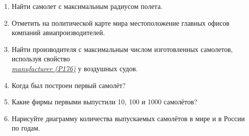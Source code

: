 \begin{enumerate}
\item Найти самолет с максимальным радиусом полета.
\item Отметить на политической карте мира местоположение главных офисов компаний авиапроизводителей.
\item Найти производителя с максимальным числом изготовленных самолетов, используя свойство\\\href{https://w.wiki/vF7}{\textit{manufacturer (P176)}} у воздушных судов.
\item Когда был построен первый самолёт?
\item Какие фирмы первыми выпустили 10, 100 и 1000 самолётов?
\item Нарисуйте диаграмму количества выпускаемых самолётов в мире и в России по годам.
\end{enumerate}
